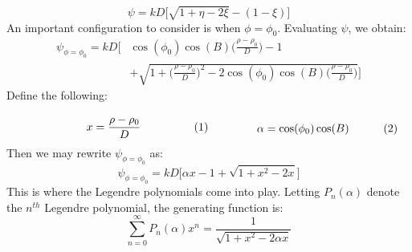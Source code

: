             \begin{equation}
                \psi=kD\big[\sqrt{1+\eta-2\xi}-(1-\xi)\big]
            \end{equation}
            An important configuration to consider is when
            $\phi=\phi_{0}$. Evaluating $\psi$, we obtain:
            \begin{equation}
                \begin{split}
                    \psi_{\phi=\phi_{0}}
                    =kD\Big[&\cos(\phi_{0})\cos(B)
                    \big(\frac{\rho-\rho_{0}}{D}\big)-1\\
                    &+\sqrt{1+
                    \big(\frac{\rho-\rho_{0}}{D}\big)^{2}
                    -2\cos(\phi_{0})\cos(B)
                    \big(\frac{\rho-\rho_{0}}{D}\big)}\Big]
                \end{split}
            \end{equation}
            Define the following:
            \par\hfill\par
            \vspace{-1ex}
            \begin{subequations}
                \begin{minipage}{0.49\textwidth}
                    \begin{equation}
                        x=\frac{\rho-\rho_{0}}{D}
                    \end{equation}
                \end{minipage}
                \hfill
                \begin{minipage}{0.49\textwidth}
                    \begin{equation}
                        \alpha=\cos(\phi_{0})\cos(B)
                    \end{equation}
                \end{minipage}
            \end{subequations}
            Then we may rewrite $\psi_{\phi=\phi_{0}}$ as:
            \begin{equation}
                \psi_{\phi=\phi_{0}}=
                kD\Big[\alpha{x}-1+\sqrt{1+x^{2}-2x}\Big]
            \end{equation}
            This is where the Legendre polynomials
            come into play. Letting $P_{n}(\alpha)$
            denote the $n^{th}$ Legendre polynomial,
            the generating function is:
            \begin{equation}
                \label{eqn:CASSINI:MATH:Legendre_Gen_Func}
                \sum_{n=0}^{\infty}P_{n}(\alpha)x^{n}
                =\frac{1}{\sqrt{1+x^{2}-2\alpha{x}}}
            \end{equation}
